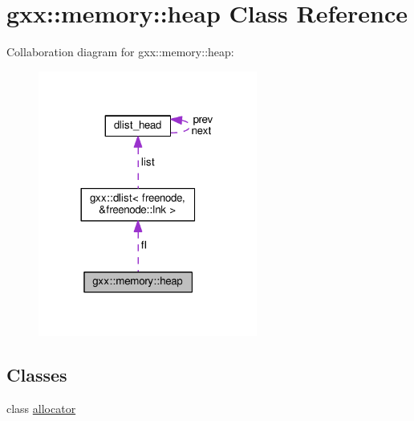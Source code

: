 \hypertarget{classgxx_1_1memory_1_1heap}{}\section{gxx\+:\+:memory\+:\+:heap Class Reference}
\label{classgxx_1_1memory_1_1heap}


Collaboration diagram for gxx\+:\+:memory\+:\+:heap\+:
\nopagebreak
\begin{figure}[H]
\begin{center}
\leavevmode
\includegraphics[width=204pt]{classgxx_1_1memory_1_1heap__coll__graph}
\end{center}
\end{figure}
\subsection*{Classes}
\begin{DoxyCompactItemize}
\item 
class \hyperlink{classgxx_1_1memory_1_1heap_1_1allocator}{allocator}
\end{DoxyCompactItemize}
